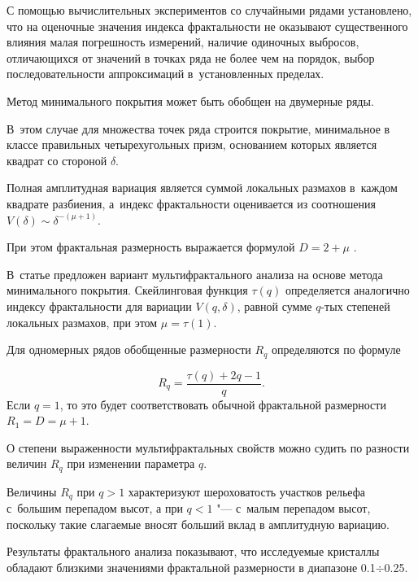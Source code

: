С помощью вычислительных экспериментов со случайными рядами установлено, что на оценочные значения индекса фрактальности не оказывают существенного влияния малая погрешность измерений, наличие одиночных выбросов, отличающихся от значений в точках ряда не более чем на порядок, выбор последовательности аппроксимаций в~установленных пределах.   



Метод минимального покрытия может быть обобщен на двумерные ряды. 

В~этом случае для множества точек ряда строится покрытие, минимальное в классе правильных четырехугольных призм, основанием которых является квадрат со стороной $\delta$. 

Полная амплитудная вариация является суммой локальных размахов в~каждом квадрате разбиения, а~индекс фрактальности оценивается из соотношения  $V(\delta)\sim\delta^{-(\mu+1)}$. 

При этом фрактальная размерность выражается формулой $D=2+\mu$ .



В~статье \cite{l13} предложен вариант мультифрактального анализа на основе метода минимального покрытия. Скейлинговая функция $\tau(q)$ определяется аналогично индексу фрактальности для вариации $V(q, \delta)$, равной сумме $q$-тых степеней локальных размахов, при этом $\mu=\tau(1)$. 

Для одномерных рядов обобщенные размерности $R_q$ определяются по формуле  

$$R_q=\frac{\tau(q)+2q-1}{q} .$$ Если $q=1$, то это будет соответствовать обычной фрактальной размерности $R_1=D=\mu+1$.



О степени выраженности мультифрактальных свойств можно судить по разности величин  $R_q$ при изменении параметра $q$.



Величины  $R_q$  при $q>1$ характеризуют шероховатость участков рельефа с~большим перепадом высот, а при $q<1$ "--- с~малым перепадом высот, поскольку такие слагаемые вносят больший вклад в амплитудную вариацию. 



\smallskip




Результаты фрактального анализа показывают, что исследуемые кристаллы обладают близкими значениями фрактальной размерности в диапазоне 0.1${\div}$0.25. 


